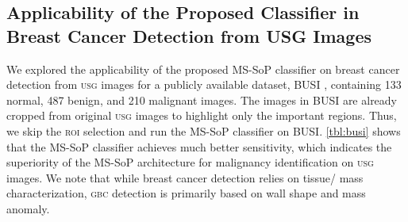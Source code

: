 \documentclass[10pt,twocolumn,letterpaper]{article}
\def\usg{\textsc{usg}\xspace}
\def\gbc{\textsc{gbc}\xspace}
\def\gb{\textsc{gb}\xspace}
\def\roi{\textsc{roi}\xspace}
\begin{document}
\begin{table}[t]
	\centering
{}
    \caption{Robustness of the curriculum in tacking texture bias while detecting \gbc. We show the performance of using curriculum on four models that apply classifiers on localized \gb region - (a) ROI+VGG16, (b) ROI+ResNet50, (c) ROI+Inception-V3, and (d) GBCNet (ROI+MS-SoP). The relative change (in percentage) in specificity for synthetic test data is shown within parentheses. The sensitivity remains unchanged as the malignant images were not altered. Observe that as compared to the models trained on high-resolution images, our VA-based curriculum is more robust to textures and is able to maintain a lower drop in specificity. The only exception is the ROI+VGG16 model, for which the curriculum training does not lower the drop in specificity. }
\label{tbl:curr_texture}
\end{table}

\subsection{Applicability of the Proposed Classifier in Breast Cancer Detection from USG Images}
We explored the applicability of the proposed MS-SoP classifier on breast cancer detection from \usg images for a publicly available dataset, BUSI \cite{al2020dataset}, containing 133 normal, 487 benign, and 210 malignant images. The images in BUSI are already cropped from original \usg images to highlight only the important regions. Thus, we skip the \roi selection and run the MS-SoP classifier on BUSI. \cref{tbl:busi} shows that the MS-SoP classifier achieves much better sensitivity, which indicates the superiority of the MS-SoP architecture for malignancy identification on \usg images. We note that while breast cancer detection relies on tissue/ mass characterization, \gbc detection is primarily based on wall shape and mass anomaly. 
\end{document}
